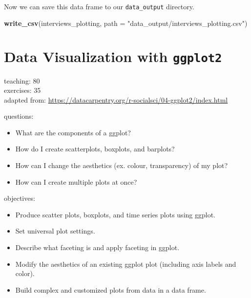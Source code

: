 \documentclass[]{book}
\newenvironment{Shaded}{\begin{snugshade}}{\end{snugshade}}
\newcommand{\KeywordTok}[1]{\textcolor[rgb]{0.13,0.29,0.53}{\textbf{#1}}}
\newcommand{\DataTypeTok}[1]{\textcolor[rgb]{0.13,0.29,0.53}{#1}}
\newcommand{\StringTok}[1]{\textcolor[rgb]{0.31,0.60,0.02}{#1}}
\newcommand{\NormalTok}[1]{#1}
\providecommand{\tightlist}{%
  \setlength{\itemsep}{0pt}\setlength{\parskip}{0pt}}
\begin{document}
Now we can save this data frame to our \texttt{data\_output} directory.

\begin{Shaded}
\begin{Highlighting}[]
\KeywordTok{write_csv}\NormalTok{(interviews_plotting, }\DataTypeTok{path =} \StringTok{"data_output/interviews_plotting.csv"}\NormalTok{)}
\end{Highlighting}
\end{Shaded}

\chapter{\texorpdfstring{Data Visualization with
\texttt{ggplot2}}{Data Visualization with ggplot2}}\label{ggplot}

teaching: 80\\
exercises: 35\\
adapted from:
\url{https://datacarpentry.org/r-socialsci/04-ggplot2/index.html}

questions:

\begin{itemize}
\tightlist
\item
  What are the components of a ggplot?\\
\item
  How do I create scatterplots, boxplots, and barplots?\\
\item
  How can I change the aesthetics (ex. colour, transparency) of my
  plot?\\
\item
  How can I create multiple plots at once?
\end{itemize}

objectives:

\begin{itemize}
\tightlist
\item
  Produce scatter plots, boxplots, and time series plots using ggplot.\\
\item
  Set universal plot settings.\\
\item
  Describe what faceting is and apply faceting in ggplot.\\
\item
  Modify the aesthetics of an existing ggplot plot (including axis
  labels and color).\\
\item
  Build complex and customized plots from data in a data frame.
\end{itemize}
\end{document}
